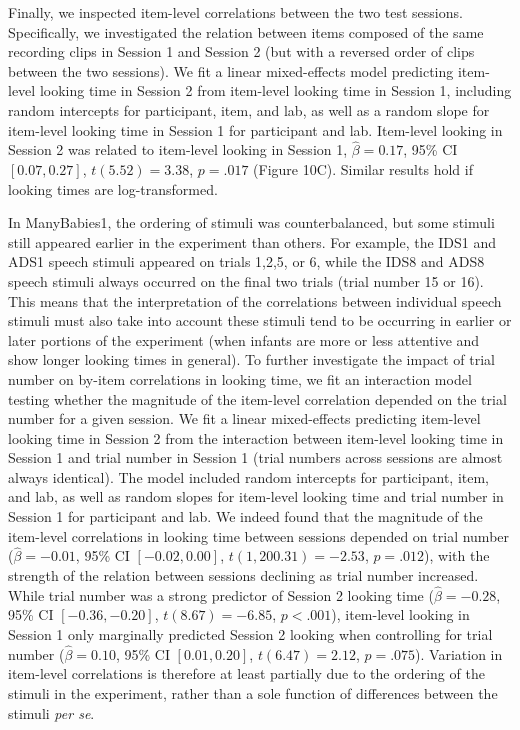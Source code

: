 \documentclass[
  man, donotrepeattitle,floatsintext]{apa6}
\begin{document}
Finally, we inspected item-level correlations between the two test sessions.
Specifically, we investigated the relation between items composed of the same recording clips in Session 1 and Session 2 (but with a reversed order of clips between the two sessions).
We fit a linear mixed-effects model predicting item-level looking time in Session 2 from item-level looking time in Session 1, including random intercepts for participant, item, and lab, as well as a random slope for item-level looking time in Session 1 for participant and lab.
Item-level looking in Session 2 was related to item-level looking in Session 1, \(\hat{\beta} = 0.17\), 95\% CI \([0.07, 0.27]\), \(t(5.52) = 3.38\), \(p = .017\) (Figure 10C).
Similar results hold if looking times are log-transformed.

In ManyBabies1, the ordering of stimuli was counterbalanced, but some stimuli still appeared earlier in the experiment than others. For example, the IDS1 and ADS1 speech stimuli appeared on trials 1,2,5, or 6, while the IDS8 and ADS8 speech stimuli always occurred on the final two trials (trial number 15 or 16). This means that the interpretation of the correlations between individual speech stimuli must also take into account these stimuli tend to be occurring in earlier or later portions of the experiment (when infants are more or less attentive and show longer looking times in general). To further investigate the impact of trial number on by-item correlations in looking time, we fit an interaction model testing whether the magnitude of the item-level correlation depended on the trial number for a given session. We fit a linear mixed-effects predicting item-level looking time in Session 2 from the interaction between item-level looking time in Session 1 and trial number in Session 1 (trial numbers across sessions are almost always identical). The model included random intercepts for participant, item, and lab, as well as random slopes for item-level looking time and trial number in Session 1 for participant and lab. We indeed found that the magnitude of the item-level correlations in looking time between sessions depended on trial number (\(\hat{\beta} = -0.01\), 95\% CI \([-0.02, 0.00]\), \(t(1,200.31) = -2.53\), \(p = .012\)), with the strength of the relation between sessions declining as trial number increased. While trial number was a strong predictor of Session 2 looking time (\(\hat{\beta} = -0.28\), 95\% CI \([-0.36, -0.20]\), \(t(8.67) = -6.85\), \(p < .001\)), item-level looking in Session 1 only marginally predicted Session 2 looking when controlling for trial number (\(\hat{\beta} = 0.10\), 95\% CI \([0.01, 0.20]\), \(t(6.47) = 2.12\), \(p = .075\)). Variation in item-level correlations is therefore at least partially due to the ordering of the stimuli in the experiment, rather than a sole function of differences between the stimuli \emph{per se}.
\end{document}
